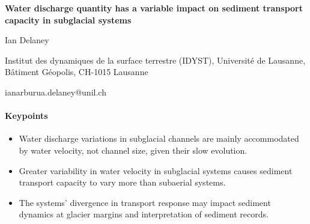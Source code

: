 \documentclass[11pt]{article}
\begin{document}
% 
% 


\begin{center}
\Large{\textbf{Water discharge quantity has a variable impact on sediment transport capacity in subglacial systems}}
\normalsize

Ian Delaney


Institut des dynamiques de la surface terrestre (IDYST), Universit\'{e} de Lausanne, B\^{a}timent G\'{e}opolis, CH-1015 Lausanne 

ianarburua.delaney@unil.ch

\end{center}






\paragraph{Keypoints}
\begin{itemize}
\item Water discharge variations in subglacial channels are mainly accommodated by water velocity, not channel size, given their slow evolution.

\item Greater variability in water velocity in subglacial systems causes sediment transport capacity to vary more than subaerial systems.

\item The systems' divergence in transport response may impact sediment dynamics at glacier margins and interpretation of sediment records.
\end{itemize}
\end{document}

